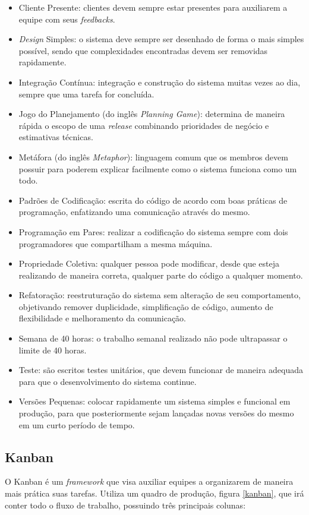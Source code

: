     \begin{itemize}
        \item Cliente Presente: clientes devem sempre estar presentes para auxiliarem a equipe com seus \textit{feedbacks}.
        \item \textit{Design} Simples: o sistema deve sempre ser desenhado de forma o mais simples possível, sendo que complexidades encontradas devem ser removidas rapidamente.
        \item Integração Contínua: integração e construção do sistema muitas vezes ao dia, sempre que uma tarefa
        for concluída.
        \item Jogo do Planejamento (do inglês \textit{Planning Game}): determina de maneira rápida o escopo de uma \textit{release} combinando prioridades de negócio e estimativas técnicas.
        \item Metáfora (do inglês \textit{Metaphor}): linguagem comum que os membros devem possuir para poderem explicar facilmente como o sistema funciona como um todo.
        \item Padrões de Codificação: escrita do código de acordo com boas práticas de programação, enfatizando uma comunicação através do mesmo.
        \item Programação em Pares: realizar a codificação do sistema sempre
        com dois programadores que compartilham a mesma máquina.
        \item Propriedade Coletiva: qualquer pessoa pode modificar, desde que esteja realizando de maneira correta, qualquer parte do código a qualquer momento.
        \item Refatoração: reestruturação do sistema sem alteração de seu comportamento, objetivando
        remover duplicidade, simplificação de código, aumento de flexibilidade e melhoramento da comunicação.
        \item Semana de 40 horas: o trabalho semanal realizado não pode ultrapassar o limite de 40 horas.
        \item Teste: são escritos testes unitários, que devem funcionar de maneira adequada para que
        o desenvolvimento do sistema continue.
        \item Versões Pequenas: colocar rapidamente um sistema simples e funcional em produção, para que posteriormente sejam lançadas novas versões do mesmo em um curto período de tempo.
    \end{itemize}

    \subsection{Kanban}
    O Kanban \cite{radigan_2015} é um \textit{framework} que visa auxiliar equipes a organizarem de maneira mais prática suas tarefas. Utiliza um quadro de produção, figura \ref{kanban}, que irá conter todo o fluxo de trabalho, possuindo três principais colunas:

